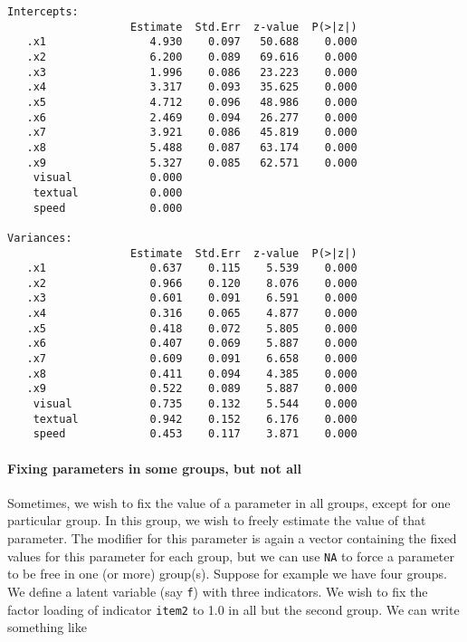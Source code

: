 \begin{verbatim}
Intercepts:
                   Estimate  Std.Err  z-value  P(>|z|)
   .x1                4.930    0.097   50.688    0.000
   .x2                6.200    0.089   69.616    0.000
   .x3                1.996    0.086   23.223    0.000
   .x4                3.317    0.093   35.625    0.000
   .x5                4.712    0.096   48.986    0.000
   .x6                2.469    0.094   26.277    0.000
   .x7                3.921    0.086   45.819    0.000
   .x8                5.488    0.087   63.174    0.000
   .x9                5.327    0.085   62.571    0.000
    visual            0.000                           
    textual           0.000                           
    speed             0.000                           

Variances:
                   Estimate  Std.Err  z-value  P(>|z|)
   .x1                0.637    0.115    5.539    0.000
   .x2                0.966    0.120    8.076    0.000
   .x3                0.601    0.091    6.591    0.000
   .x4                0.316    0.065    4.877    0.000
   .x5                0.418    0.072    5.805    0.000
   .x6                0.407    0.069    5.887    0.000
   .x7                0.609    0.091    6.658    0.000
   .x8                0.411    0.094    4.385    0.000
   .x9                0.522    0.089    5.887    0.000
    visual            0.735    0.132    5.544    0.000
    textual           0.942    0.152    6.176    0.000
    speed             0.453    0.117    3.871    0.000
\end{verbatim}

\hypertarget{fixing-parameters-in-some-groups-but-not-all}{%
\paragraph{Fixing parameters in some groups, but not
all}\label{fixing-parameters-in-some-groups-but-not-all}}

Sometimes, we wish to fix the value of a parameter in all groups, except
for one particular group. In this group, we wish to freely estimate the
value of that parameter. The modifier for this parameter is again a
vector containing the fixed values for this parameter for each group,
but we can use \texttt{NA} to force a parameter to be free in one (or
more) group(s). Suppose for example we have four groups. We define a
latent variable (say \texttt{f}) with three indicators. We wish to fix
the factor loading of indicator \texttt{item2} to 1.0 in all but the
second group. We can write something like

